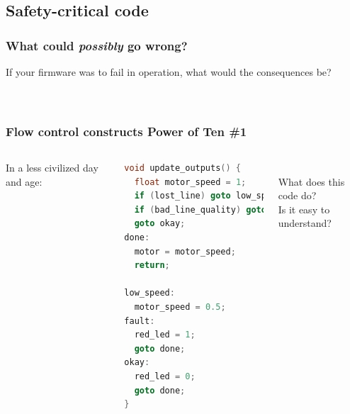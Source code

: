 \documentclass{beamer}
\begin{document}
\subsection{Safety-critical code}
\begin{frame}
\frametitle{What could \textit{possibly} go wrong?}
If your firmware was to fail in operation, what would the consequences be? \\
\hfill \\
\hfill \\
\end{frame}


\begin{frame}[fragile]
\frametitle{Flow control constructs \small{Power of Ten \#1}}
\begin{columns}[t]
In a less civilized day and age: \\
\begin{lstlisting}[language=C++,basicstyle=\ttfamily\tiny]
void update_outputs() {
  float motor_speed = 1;
  if (lost_line) goto low_speed;
  if (bad_line_quality) goto fault;
  goto okay;
done:
  motor = motor_speed;
  return;
  
low_speed:
  motor_speed = 0.5;
fault:
  red_led = 1;
  goto done;
okay:
  red_led = 0;
  goto done;
}
\end{lstlisting}
\hfill \\
What does this code do? \\
Is it easy to understand?
\end{columns}
\end{frame}
\end{document}
